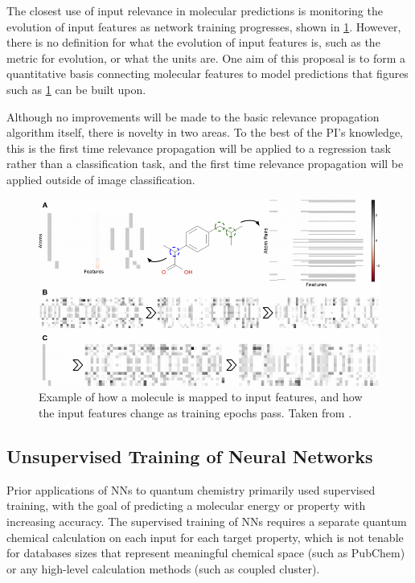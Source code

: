 \documentclass[12pt]{article}
\begin{document}
The closest use of input relevance in molecular predictions is monitoring the evolution of input features as network training progresses\cite{Kearnes2016}, shown in \ref{fig:org949b81b}. However, there is no definition for what the evolution of input features is, such as the metric for evolution, or what the units are. One aim of this proposal is to form a quantitative basis connecting molecular features to model predictions that figures such as \ref{fig:org949b81b} can be built upon.

Although no improvements will be made to the basic relevance propagation algorithm itself, there is novelty in two areas. To the best of the PI's knowledge, this is the first time relevance propagation will be applied to a regression task rather than a classification task, and the first time relevance propagation will be applied outside of image classification.

\begin{figure}[htbp]
\centering
\includegraphics[width=.9\linewidth]{10822_2016_9938_Fig8_HTML.png}
\caption{\label{fig:org949b81b}
Example of how a molecule is mapped to input features, and how the input features change as training epochs pass. Taken from \parencite{Kearnes2016}.}
\end{figure}

\subsection{Unsupervised Training of Neural Networks}
\label{sec:orgb054bd9}

Prior applications of NNs to quantum chemistry primarily used supervised training, with the goal of predicting a molecular energy or property with increasing accuracy. The supervised training of NNs requires a separate quantum chemical calculation on each input for each target property, which is not tenable for databases sizes that represent meaningful chemical space (such as PubChem\cite{doi:10.1021/acs.jcim.7b00083}) or any high-level calculation methods (such as coupled cluster).
\end{document}
